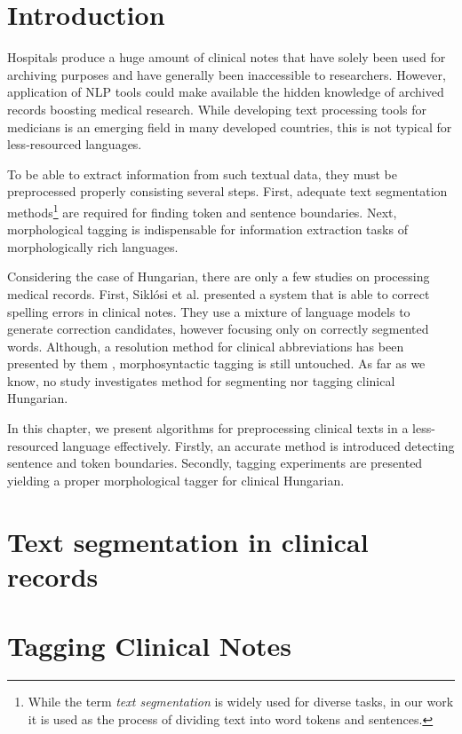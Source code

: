 
\section{Introduction}

Hospitals produce a huge amount of clinical notes that have solely been used for archiving purposes and have generally been inaccessible to researchers. However, application of NLP tools could make available the hidden knowledge of archived records boosting medical research. 
While developing text processing tools for medicians is an emerging field in many developed countries, this is not typical for less-resourced languages.

To be able to extract information from such textual data, they must be preprocessed properly consisting several steps.
First, adequate text segmentation methods\footnote{While the term \emph{text segmentation} is widely used for diverse tasks, in our work it is used as the process of dividing text into word tokens and sentences.} 
are required for finding token and sentence boundaries. Next, morphological tagging is indispensable for information extraction tasks of morphologically rich languages. 

Considering the case of Hungarian, there are only a few studies on processing medical records. First, Siklósi et al. \cite{Siklosi2012,Siklosi2013} presented a system that is able to correct spelling errors in clinical notes. They use a mixture of language models to generate correction candidates, however focusing only on correctly segmented words. 
Although, a resolution method for clinical abbreviations has been presented by them \cite{Siklosi2013b}, morphosyntactic tagging is still untouched. 
As far as we know, no study investigates method for segmenting nor tagging clinical Hungarian. 

In this chapter, we present algorithms for preprocessing clinical texts in a less-resourced language effectively. Firstly, an accurate method is introduced detecting sentence and token boundaries. Secondly, tagging experiments are presented yielding a proper morphological tagger for clinical Hungarian. 

\section{Text segmentation in clinical records}


\pagebreak

\section{Tagging Clinical Notes}


